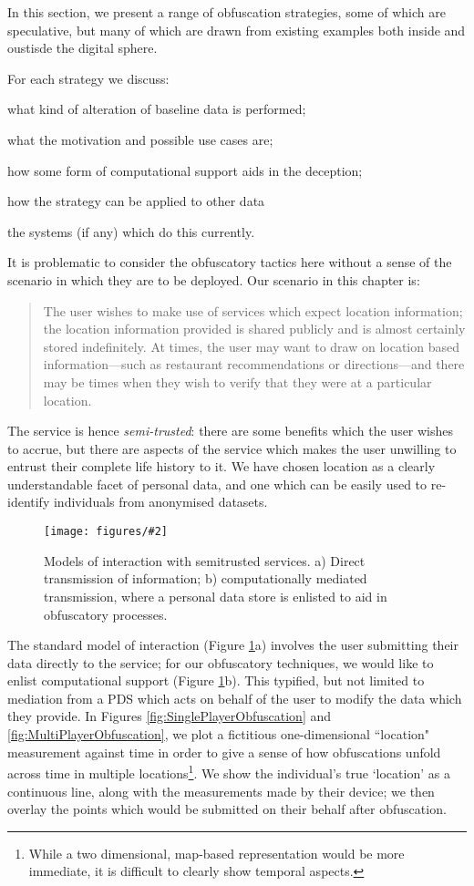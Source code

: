 \documentclass{IOS-Book-Article}     %
\newcommand{\fig}[3][0.9]{
\begin{figure}[tp]
\begin{center}
\texttt{[image: figures/\#2]}
\caption{#3}
\label{fig:#2}
\end{center}
\end{figure}
}
\begin{document}
In this section, we present a range of obfuscation strategies, some of which are
speculative, but many of which are drawn from existing examples both inside and
oustisde the digital sphere.

For each strategy we discuss: \begin{inparaenum}
\item what kind of alteration of baseline data is performed;
\item what the motivation and possible use cases are;
\item how some form of computational support aids in the deception;
\item how the strategy can be applied to other data
\item the systems (if any) which do this currently.
\end{inparaenum}


It is problematic to consider the obfuscatory tactics here without a sense of
the scenario in which they are to be deployed. Our scenario in this chapter is:
\begin{quote}
The user wishes to make use of services which expect location information; 
the location information provided is shared publicly and is almost
certainly stored indefinitely. At times, the user may want to draw on location
based information---such as restaurant recommendations or directions---and there
may be times when they wish to verify that they were at a particular location.
\end{quote}
The service is hence \emph{semi-trusted}: there are some benefits which the user
wishes to accrue, but there are aspects of the service which makes the user
unwilling to entrust their complete life history to it. We have chosen location
as a clearly understandable facet of personal data, and one which can be easily
used to re-identify individuals from anonymised
datasets\cite{montjoye2013Unique}.

\fig{Mediation}{Models of interaction with semitrusted services. a) Direct
transmission of information; b) computationally mediated transmission, where a
personal data store is enlisted to aid in obfuscatory processes.}

The standard model of interaction (Figure \ref{fig:Mediation}a) involves the
user submitting their data directly to the service; for our obfuscatory
techniques, we would like to enlist computational support (Figure
\ref{fig:Mediation}b). This typified, but not limited to mediation from a PDS
which acts on behalf of the user to modify the data which they provide.
In Figures \ref{fig:SinglePlayerObfuscation} and
\ref{fig:MultiPlayerObfuscation}, we plot a fictitious one-dimensional
``location" measurement against time in order to give a sense of how
obfuscations unfold across time in multiple locations\footnote{While a two
dimensional, map-based representation would be more immediate, it is difficult
to clearly show temporal aspects.}. We show the individual's true `location' as
a continuous line, along with the measurements made by their device; we then
overlay the points which would be submitted on their behalf after obfuscation.
\end{document}
